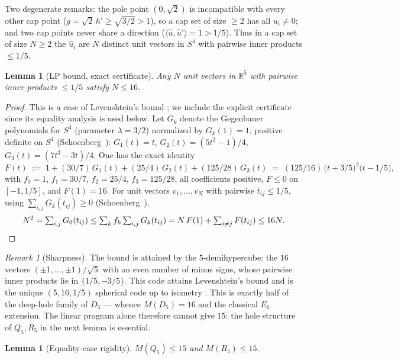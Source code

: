 \documentclass[11pt]{article}
\newtheorem{lemma}[theorem]{Lemma}
\theoremstyle{remark}
\newtheorem{remark}[theorem]{Remark}
\newcommand{\R}{\mathbb{R}}
\newcommand{\ip}[2]{\langle #1,#2\rangle}
\begin{document}
Two degenerate remarks: the pole point $(0,\sqrt2)$ is incompatible
with every other cap point ($g=\sqrt2\,h'\ge\sqrt{3/2}>1$), so a cap
set of size $\ge 2$ has all $u_i\ne 0$; and two cap points never share
a direction ($\ip{\hat u}{\hat u'}=1>1/5$). Thus in a cap set of size
$N\ge 2$ the $\hat u_i$ are $N$ distinct unit vectors in $S^4$ with
pairwise inner products $\le 1/5$.

\begin{lemma}[LP bound, exact certificate]\label{lem:lp}
Any $N$ unit vectors in $\R^5$ with pairwise inner products $\le 1/5$
satisfy $N\le 16$.
\end{lemma}

\begin{proof}
This is a case of Levenshtein's bound \cite{Lev1979}; we include the
explicit certificate since its equality analysis is used below.
Let $G_k$ denote the Gegenbauer polynomials for $S^4$ (parameter
$\lambda=3/2$) normalized by $G_k(1)=1$, positive definite on $S^4$
(Schoenberg~\cite{Schoenberg1942}): $G_1(t)=t$, $G_2(t)=(5t^2-1)/4$, $G_3(t)=(7t^3-3t)/4$.
One has the exact identity
\[
F(t) \;:=\; 1 + (30/7)\,G_1(t) + (25/4)\,G_2(t)
+ (125/28)\,G_3(t) \;=\; (125/16)\,
\bigl(t+3/5\bigr)^2\bigl(t-1/5\bigr),
\]
with $f_0=1$, $f_1=30/7$, $f_2=25/4$, $f_3=125/28$, all coefficients
positive, $F\le 0$ on $[-1,1/5]$, and $F(1)=16$.
For unit vectors $v_1,\dots,v_N$ with pairwise $t_{ij}\le 1/5$, using
$\sum_{i,j}G_k(t_{ij})\ge 0$ (Schoenberg~\cite{Schoenberg1942}),
\[
N^2=\textstyle\sum_{i,j}G_0(t_{ij})
\le \sum_k f_k\sum_{i,j}G_k(t_{ij})
= N\,F(1) + \sum_{i\ne j}F(t_{ij}) \le 16N . \qedhere
\]
\end{proof}

\begin{remark}[Sharpness]\label{rem:sharp}
The bound is attained by the $5$-demihypercube: the $16$ vectors
$(\pm1,\dots,\pm1)/\sqrt5$ with an even number of minus signs, whose
pairwise inner products lie in $\{1/5,-3/5\}$. This code attains
Levenshtein's bound \cite{Lev1979} and is the unique $(5,16,1/5)$
spherical code up to isometry \cite[Appendix~A]{CK2007}. This is exactly half of
the deep-hole family of $D_5$ --- whence $M(D_5)=16$ and the classical
$E_6$ extension. The linear program alone therefore cannot give $15$:
the hole structure of $Q_5,R_5$ in the next lemma is essential.
\end{remark}

\begin{lemma}[Equality-case rigidity]\label{lem:rigid}
$M(Q_5)\le 15$ and $M(R_5)\le 15$.
\end{lemma}
\end{document}
